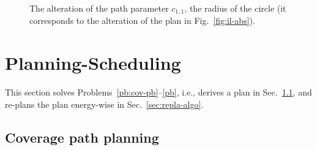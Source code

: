\documentclass[letterpaper,10pt,journal,twoside]{IEEEtran}
\newcommand{\figpath}{./figures}
\theoremstyle{definition}
\begin{document}




\begin{figure}[t]
  \footnotesize
  \begin{minipage}[l]{0.25\columnwidth}
    \caption{The alteration of the path parameter $c_{1,1}$, the radius of the circle (it corresponds to the alteration of the plan in Fig.~\ref{fig:il-abs}).}
    \label{fig:tee1}
  \end{minipage}\hfill
  \begin{minipage}[c]{0.7\columnwidth}
    \centering
    \vspace*{-4.5ex}
    
  \end{minipage}
  \vspace*{-4.5ex}
\end{figure}

\section{Planning-Scheduling}  %
\label{sec:algo}               %
This section solves Problems~\ref{pb:cov-pb}--\ref{pb}, i.e., derives a plan in Sec.~\ref{sec:cov-algo}, and re-plans the plan energy-wise in Sec.~\ref{sec:repla-algo}.

\subsection{Coverage path planning}
\label{sec:cov-algo}
\end{document}
